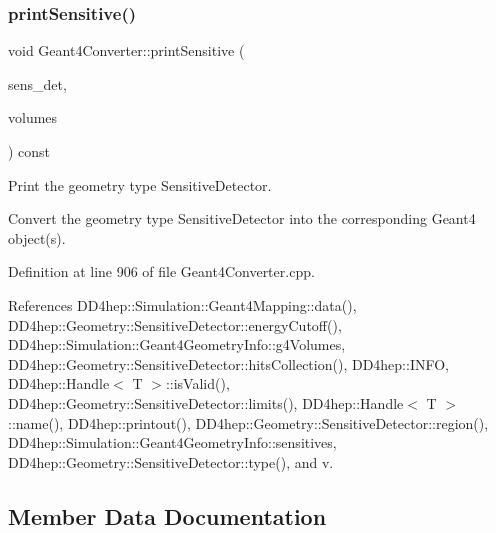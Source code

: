 \hypertarget{class_d_d4hep_1_1_simulation_1_1_geant4_converter_ac92f1e56c30c8924b22a47e06738daaa}{}\label{class_d_d4hep_1_1_simulation_1_1_geant4_converter_ac92f1e56c30c8924b22a47e06738daaa} 
\subsubsection{\texorpdfstring{print\+Sensitive()}{printSensitive()}}
{\footnotesize\ttfamily void Geant4\+Converter\+::print\+Sensitive (\begin{DoxyParamCaption}\item[{\hyperlink{class_d_d4hep_1_1_simulation_1_1_geant4_mapping_ae27ee51d13bf8ae59e8bee3fcecdbc85}{Sensitive\+Detector}}]{sens\+\_\+det,  }\item[{const std\+::set$<$ const T\+Geo\+Volume $\ast$$>$ \&}]{volumes }\end{DoxyParamCaption}) const\hspace{0.3cm}{\ttfamily [virtual]}}



Print the geometry type Sensitive\+Detector. 

Convert the geometry type Sensitive\+Detector into the corresponding Geant4 object(s). 

Definition at line 906 of file Geant4\+Converter.\+cpp.



References D\+D4hep\+::\+Simulation\+::\+Geant4\+Mapping\+::data(), D\+D4hep\+::\+Geometry\+::\+Sensitive\+Detector\+::energy\+Cutoff(), D\+D4hep\+::\+Simulation\+::\+Geant4\+Geometry\+Info\+::g4\+Volumes, D\+D4hep\+::\+Geometry\+::\+Sensitive\+Detector\+::hits\+Collection(), D\+D4hep\+::\+I\+N\+FO, D\+D4hep\+::\+Handle$<$ T $>$\+::is\+Valid(), D\+D4hep\+::\+Geometry\+::\+Sensitive\+Detector\+::limits(), D\+D4hep\+::\+Handle$<$ T $>$\+::name(), D\+D4hep\+::printout(), D\+D4hep\+::\+Geometry\+::\+Sensitive\+Detector\+::region(), D\+D4hep\+::\+Simulation\+::\+Geant4\+Geometry\+Info\+::sensitives, D\+D4hep\+::\+Geometry\+::\+Sensitive\+Detector\+::type(), and v.



\subsection{Member Data Documentation}
\hypertarget{class_d_d4hep_1_1_simulation_1_1_geant4_converter_a5afb918294afbed48b9c713f750fb017}{}\label{class_d_d4hep_1_1_simulation_1_1_geant4_converter_a5afb918294afbed48b9c713f750fb017} 
